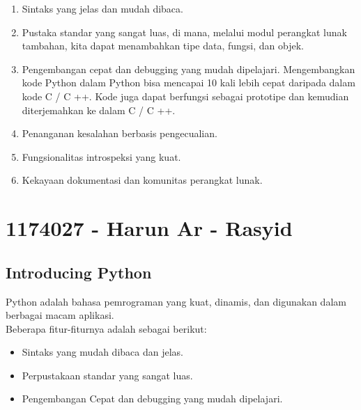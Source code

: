 \begin{enumerate}
	\item Sintaks yang jelas dan mudah dibaca.
	\item Pustaka standar yang sangat luas, di mana, melalui modul perangkat lunak tambahan, kita dapat menambahkan tipe data, fungsi, dan objek. 
	\item Pengembangan cepat dan debugging yang mudah dipelajari. Mengembangkan kode Python dalam Python bisa mencapai 10 kali lebih cepat daripada dalam kode C / C ++. Kode juga dapat berfungsi sebagai prototipe dan kemudian diterjemahkan ke dalam C / C ++.
    \item Penanganan kesalahan berbasis pengecualian.
    \item Fungsionalitas introspeksi yang kuat.
    \item Kekayaan dokumentasi dan komunitas perangkat lunak.
\end{enumerate}

\section{1174027 - Harun Ar - Rasyid}
\subsection{Introducing Python}
\hfill\break
Python adalah bahasa pemrograman yang kuat, dinamis, dan digunakan dalam berbagai macam aplikasi. \\
Beberapa fitur-fiturnya adalah sebagai berikut:
\begin{itemize}
    \item Sintaks yang mudah dibaca dan jelas.
    \item Perpustakaan standar yang sangat luas.
    \item Pengembangan Cepat dan debugging yang mudah dipelajari.
\end{itemize}
